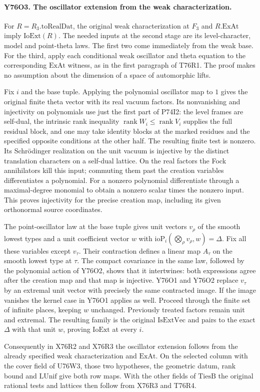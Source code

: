 \paragraph{Y76O3. The oscillator extension from the weak characterization.}
For $R=R_3.\mathrm{toRealDat}$, the original weak characterization
at $F_3$ and $R.\mathrm{ExAt}$ imply $\mathrm{IoExt}(R)$.
The needed inputs at the second stage are its level-character,
model and point-theta laws. The first two come immediately
from the weak base. For the third, apply each conditional weak
oscillator and theta equation to the corresponding $\mathrm{ExAt}$
witness, as in the first paragraph of T76R1. The proof makes
no assumption about the dimension of a space of automorphic lifts.

Fix $i$ and the base tuple. Applying the polynomial oscillator
map to $1$ gives the original finite theta vector with its real
vacuum factors. Its nonvanishing and injectivity on polynomials
use just the first part of P74I2: the level frames are self-dual,
the intrinsic rank inequality $\operatorname{rank} W_i\le
\operatorname{rank} V_i$ supplies the full residual block, and
one may take identity blocks at the marked residues and the
specified opposite conditions at the other half. The resulting
finite test is nonzero. Its Schr\"odinger realization on the
unit vacuum is injective by the distinct translation characters
on a self-dual lattice. On the real factors the Fock
annihilators kill this input; commuting them past the creation
variables differentiates a polynomial. For a nonzero polynomial
differentiate through a maximal-degree monomial to obtain a
nonzero scalar times the nonzero input. This proves injectivity
for the precise creation map, including its given orthonormal
source coordinates.

The point-oscillator law at the base tuple gives unit vectors
$v_\rho$ of the smooth lowest types and a unit coefficient vector
$w$ with $\mathrm{ioP}_i(\bigotimes_\rho v_\rho,w)=\Delta$.
Fix all these variables except $v_\tau$. Their contraction
defines a linear map $A_\tau$ on the smooth lowest type at
$\tau$. The compact covariance in the same law, followed by
the polynomial action of Y76O2, shows that it intertwines:
both expressions agree after the creation map and that map
is injective. Y76O1 and Y76O2 replace $v_\tau$ by an
extremal unit vector with precisely the same contracted image.
If the image vanishes the kernel case in Y76O1 applies as well.
Proceed through the finite set of infinite places, keeping
$w$ unchanged. Previously treated factors remain unit and
extremal. The resulting family is the original
$\mathrm{IsExtVec}$ and pairs to the exact $\Delta$ with
that unit $w$, proving $\mathrm{IoExt}$ at every $i$.

Consequently in X76R2 and X76R3 the oscillator extension follows
from the already specified weak characterization and $\mathrm{ExAt}$.
On the selected column with the cover field of U76W3, those
two hypotheses, the geometric datum, rank bound and
$\mathrm{LUnif}$ give both row maps. With the other fields
of $\mathrm{TiesB}$ the original rational tests and lattices
then follow from X76R3 and T76R4.

